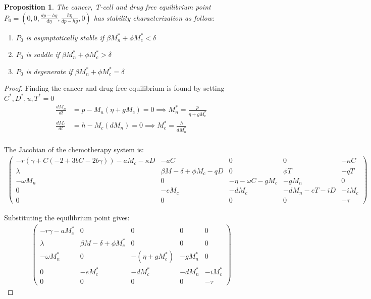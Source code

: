 \documentclass[11pt]{article}
\newtheorem{proposition}{Proposition}
\theoremstyle{definition}
\begin{document}
\begin{proposition}
  The cancer, T-cell and drug free equilibrium point $P_0 =( 0, 0, \frac{dp - hg}{d\eta}, \frac{h\eta}{dp - hg}, 0)$ has stability characterization as follow: 
  \begin{enumerate}
    \item $P_0$ is asymptotically stable if \(\beta M_n^* + \phi M_c^* < \delta\)
    \item $P_0$ is saddle if \(\beta M_n^* + \phi M_c^* > \delta\)
    \item $P_0$ is degenerate if \(\beta M_n^* + \phi M_c^* = \delta\)
  \end{enumerate}
\end{proposition}
\begin{proof}

Finding the cancer and drug free equilibrium is found by setting $C^*, D^*, u, T^* =0$
\begin{align*}
\frac{dM_n}{dt} &= p - M_n(\eta + gM_c) = 0 \implies M_n^* = \frac{p}{\eta + gM_c^*}\\
\frac{dM_c}{dt} &= h - M_c(dM_n ) = 0 \implies M_c^* = \frac{h}{dM_n^*}\\
\end{align*}

\noindent The Jacobian of the chemotherapy system is: 
\begin{align*}
\left( \begin{smallmatrix}
-r(\gamma + C(-2 + 3bC - 2b\gamma)) - aM_c- \kappa D & -aC & 0 & 0 & -\kappa C \\
\lambda &  \beta M - \delta + \phi M_c - qD & 0 & \phi T & -qT \\
-\omega M_n & 0 & -\eta - \omega C - g M_c & -g M_n & 0 \\
0 & -e M_c & -d M_c & -d M_n - e T - i D & -i M_c \\
0 & 0 & 0 & 0 & -\tau
\end{smallmatrix} \right)
\end{align*}

\noindent Substituting the equilibrium point gives: 
\begin{align*}\left( \begin{smallmatrix}
-r\gamma - aM_c^* & 0 & 0 & 0 & 0 \\
\lambda & \beta M - \delta + \phi M_c^* & 0 & 0 & 0 \\
-\omega M_n^* & 0 & -(\eta + g M_c^*) & -g M_n^* & 0 \\
0 & -e M_c^* & -d M_c^* & -d M_n^* & -i M_c^* \\
0 & 0 & 0 & 0 & -\tau
\end{smallmatrix} \right) \end{align*}


\end{proof}
\end{document}
